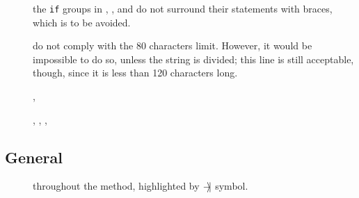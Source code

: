 
\begin{description}

	\item [] 
		the \verb|if| groups in , , and  do not surround their statements with braces, which is to be avoided. 
		
	\item [] 	do not comply with the 80 characters limit. However, it would be impossible to do so, unless the string is divided; this line is still acceptable, though, since it is less than 120 characters long.  

\end{description}


\begin{description}
		
	\item [] , 
	
	\item [] , 	, , 


\end{description}








\subsection{General}

\begin{description}
	\item []
		throughout the method, highlighted by {$-\hspace{-0.4em}\rangle\hspace{-0.2em}|$} symbol. %

\end{description}






